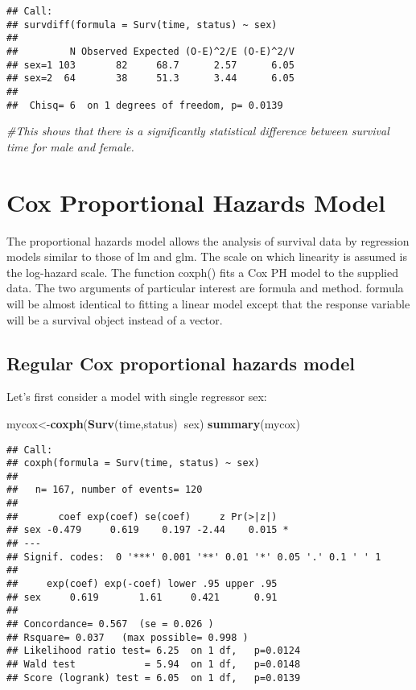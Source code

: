 \documentclass[]{book}
\newenvironment{Shaded}{\begin{snugshade}}{\end{snugshade}}
\newcommand{\KeywordTok}[1]{\textcolor[rgb]{0.13,0.29,0.53}{\textbf{#1}}}
\newcommand{\CommentTok}[1]{\textcolor[rgb]{0.56,0.35,0.01}{\textit{#1}}}
\newcommand{\OperatorTok}[1]{\textcolor[rgb]{0.81,0.36,0.00}{\textbf{#1}}}
\newcommand{\NormalTok}[1]{#1}
\theoremstyle{definition}
\theoremstyle{definition}
\theoremstyle{definition}
\theoremstyle{remark}
\begin{document}
\begin{verbatim}
## Call:
## survdiff(formula = Surv(time, status) ~ sex)
## 
##         N Observed Expected (O-E)^2/E (O-E)^2/V
## sex=1 103       82     68.7      2.57      6.05
## sex=2  64       38     51.3      3.44      6.05
## 
##  Chisq= 6  on 1 degrees of freedom, p= 0.0139
\end{verbatim}

\begin{Shaded}
\begin{Highlighting}[]
\CommentTok{#This shows that there is a significantly statistical difference between survival time for male and female.}
\end{Highlighting}
\end{Shaded}

\section{Cox Proportional Hazards
Model}\label{cox-proportional-hazards-model}

The proportional hazards model allows the analysis of survival data by
regression models similar to those of lm and glm. The scale on which
linearity is assumed is the log-hazard scale. The function coxph() fits
a Cox PH model to the supplied data. The two arguments of particular
interest are formula and method. formula will be almost identical to
fitting a linear model except that the response variable will be a
survival object instead of a vector.

\subsection{Regular Cox proportional hazards
model}\label{regular-cox-proportional-hazards-model}

Let's first consider a model with single regressor sex:

\begin{Shaded}
\begin{Highlighting}[]
\NormalTok{mycox<-}\KeywordTok{coxph}\NormalTok{(}\KeywordTok{Surv}\NormalTok{(time,status)}\OperatorTok{~}\NormalTok{sex)}
\KeywordTok{summary}\NormalTok{(mycox)}
\end{Highlighting}
\end{Shaded}

\begin{verbatim}
## Call:
## coxph(formula = Surv(time, status) ~ sex)
## 
##   n= 167, number of events= 120 
## 
##       coef exp(coef) se(coef)     z Pr(>|z|)  
## sex -0.479     0.619    0.197 -2.44    0.015 *
## ---
## Signif. codes:  0 '***' 0.001 '**' 0.01 '*' 0.05 '.' 0.1 ' ' 1
## 
##     exp(coef) exp(-coef) lower .95 upper .95
## sex     0.619       1.61     0.421      0.91
## 
## Concordance= 0.567  (se = 0.026 )
## Rsquare= 0.037   (max possible= 0.998 )
## Likelihood ratio test= 6.25  on 1 df,   p=0.0124
## Wald test            = 5.94  on 1 df,   p=0.0148
## Score (logrank) test = 6.05  on 1 df,   p=0.0139
\end{verbatim}
\end{document}
